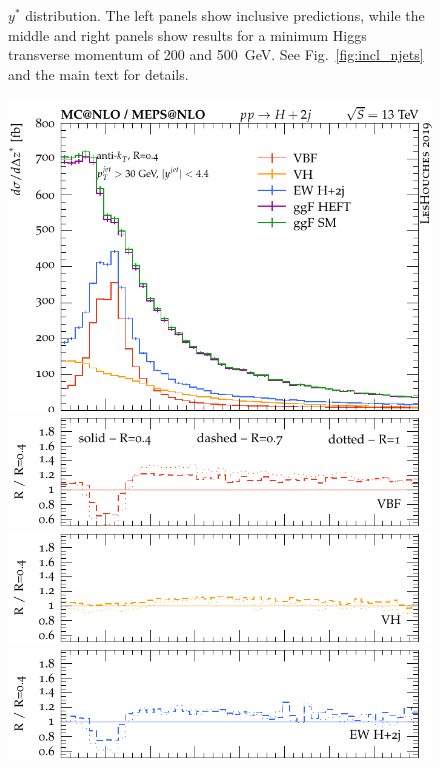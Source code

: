 \documentclass[10pt,prd,fleqn,superscriptaddress,notitlepage,nofootinbib,preprintnumbers,nobalancelastpage]{revtex4-1}
\begin{document}
\begin{figure}[p]
\begin{minipage}{.2925\textwidth}
  \end{minipage}
\caption{$y^*$ distribution.
The left panels show inclusive predictions, while the middle and right panels
show results for a minimum Higgs transverse momentum of 200 and 500~GeV.
See Fig.~\ref{fig:incl_njets} and the main text for details.}
\label{fig:incl_y_star}
\end{figure}
\begin{figure}[p]
  \centering
  \begin{minipage}{.295\textwidth}
    \includegraphics[width=\textwidth]{figures/channels/z_star.pdf}
    \includegraphics[width=\textwidth]{figures/channels/z_star_rVBF.pdf}
    \includegraphics[width=\textwidth]{figures/channels/z_star_rVH.pdf}
    \includegraphics[width=\textwidth]{figures/channels/z_star_rHJJ.pdf}

\end{minipage}
\end{figure}
\end{document}
